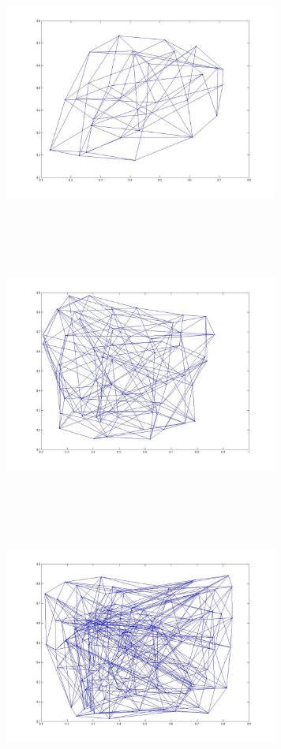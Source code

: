 \includegraphics[width=9.0cm,height=9.0cm]{images/GraphTheory/hypercube_5_Dimension.jpg}
\includegraphics[width=9.0cm,height=9.0cm]{images/GraphTheory/hypercube_6_Dimension.jpg}
\includegraphics[width=9.0cm,height=9.0cm]{images/GraphTheory/hypercube_7_Dimension.jpg}
